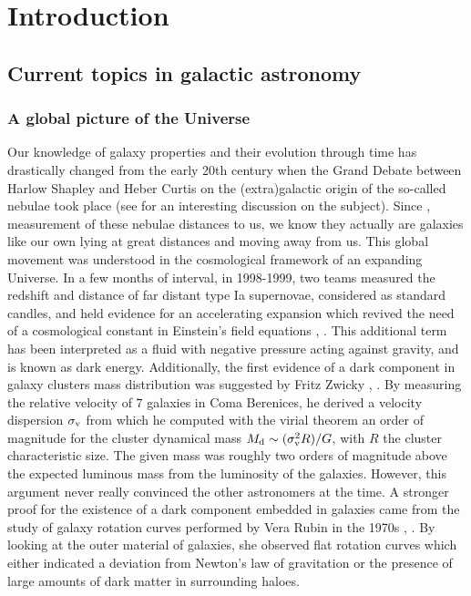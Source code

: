 \clearpage
\section{Introduction}
\label{sec:Intro}

\subsection{Current topics in galactic astronomy}

\subsubsection{A global picture of the Universe}

Our knowledge of galaxy properties and their evolution through time has drastically changed from the early 20th century when the Grand Debate  between Harlow Shapley and Heber Curtis on the (extra)galactic origin of the so-called nebulae took place (see  for an interesting discussion on the subject). Since ,  measurement of these nebulae distances to us, we know they actually are galaxies like our own lying at great distances and moving away from us. This global movement was understood in the cosmological framework of an expanding Universe. In a few months of interval, in 1998-1999, two teams measured the redshift and distance of far distant type Ia supernovae, considered as standard candles, and held evidence for an accelerating expansion which revived the need of a cosmological constant in Einstein's field equations , . This additional term has been interpreted as a fluid with negative pressure acting against gravity, and is known as dark energy. Additionally, the first evidence of a dark component in galaxy clusters mass distribution was suggested by Fritz Zwicky , . By measuring the relative velocity of $7$ galaxies in Coma Berenices, he derived a velocity dispersion $\sigma_{\rm{v}}$ from which he computed with the virial theorem an order of magnitude for the cluster dynamical mass $M_{\rm{d}} \sim (\sigma_{\rm{v}}^2 R ) / G$, with $R$ the cluster characteristic size. The given mass was roughly two orders of magnitude above the expected luminous mass from the luminosity of the galaxies. However, this argument never really convinced the other astronomers at the time. A stronger proof for the existence of a dark component embedded in galaxies came from the study of galaxy rotation curves performed by Vera Rubin in the 1970s , . By looking at the outer material of galaxies, she observed flat rotation curves which either indicated a deviation from Newton's law of gravitation or the presence of large amounts of dark matter in surrounding haloes. \\

